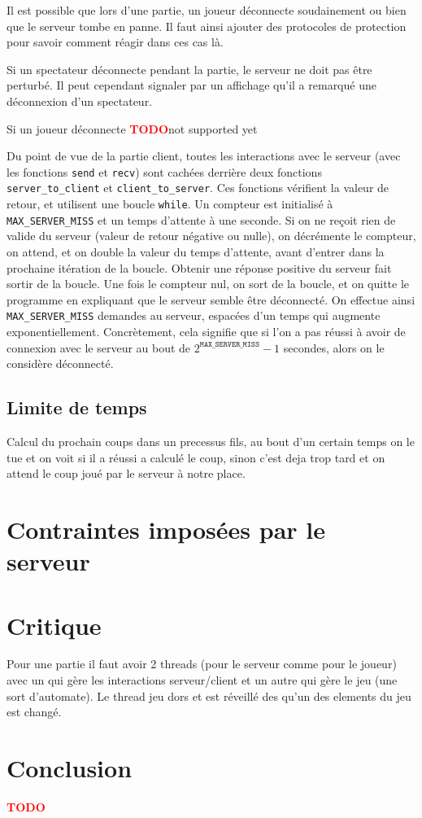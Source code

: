 \documentclass[a4paper]{article}
\newcommand{\TODO}{\textcolor{red}{\textbf{TODO}}}
\begin{document}
Il est possible que lors d'une partie, un joueur déconnecte soudainement ou 
bien que le serveur tombe en panne. Il faut ainsi ajouter des protocoles de 
protection pour savoir comment réagir dans ces cas là.

Si un spectateur déconnecte pendant la partie, le serveur ne doit pas être 
perturbé. Il peut cependant signaler par un affichage qu'il a remarqué une 
déconnexion d'un spectateur.

Si un joueur déconnecte \TODO not supported yet

Du point de vue de la partie client, toutes les interactions avec le serveur 
(avec les fonctions \texttt{send} et \texttt{recv}) sont cachées derrière deux 
fonctions \texttt{server\_to\_client} et \texttt{client\_to\_server}. Ces 
fonctions vérifient la valeur de retour, et utilisent une boucle 
\texttt{while}. Un compteur est initialisé à \texttt{MAX\_SERVER\_MISS} et un 
temps d'attente à une seconde. Si on ne reçoit rien de valide du serveur 
(valeur de retour négative ou nulle), on décrémente le compteur, on attend, et 
on double la valeur du temps d'attente, avant d'entrer dans la prochaine 
itération de la boucle. Obtenir une réponse positive du serveur fait sortir de 
la boucle. Une fois le compteur nul, on sort de la boucle, et on quitte le 
programme en expliquant que le serveur semble être déconnecté. On effectue 
ainsi \texttt{MAX\_SERVER\_MISS} demandes au serveur, espacées d'un temps qui 
augmente exponentiellement. Concrètement, cela signifie que si l'on a pas 
réussi à avoir de connexion avec le serveur au bout de 
$2^{\texttt{MAX\_SERVER\_MISS}} - 1$ secondes, alors on le considère déconnecté.


\subsection{Limite de temps}

Calcul du prochain coups dans un precessus fils, au bout d'un certain temps on 
le tue et on voit si il a réussi a calculé le coup, sinon c'est deja trop tard 
et on attend le coup joué par le serveur à notre place.


\section{Contraintes imposées par le serveur}



\section{Critique}

Pour une partie il faut avoir 2 threads (pour le serveur comme pour le joueur) 
avec un qui gère les interactions serveur/client et un autre qui gère le jeu 
(une sort d'automate). Le thread jeu dors et est réveillé des qu'un des 
elements du jeu est changé.


\section*{Conclusion}

\TODO


 

\end{document}
